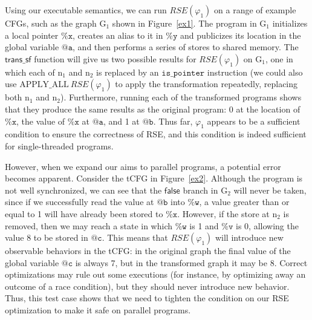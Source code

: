 \documentclass{eptcs}
\begin{document}
Using our executable semantics, we can run $\mathit{RSE}(\varphi_1)$ on a range of example \acp{CFG}, such as the graph $\mathrm{G_1}$ shown in Figure~\ref{ex1}. The program in $\mathrm{G_1}$ initializes a local pointer $\mathtt{\%x}$, creates an alias to it in $\mathtt{\%y}$ and publicizes its location in the global variable $\mathtt{@a}$, and then performs a series of stores to shared memory.
The $\mathsf{trans\_sf}$ function will give us two possible results for $\mathit{RSE}(\varphi_1)$ on $\mathrm{G_1}$, one in which each of $\mathrm{n_1}$ and $\mathrm{n_2}$ is replaced by an $\mathtt{is\_pointer}$ instruction (we could also use $\mathrm{APPLY\_ALL}\ \mathit{RSE}(\varphi_1)$ to apply the transformation repeatedly, replacing both $\mathrm{n_1}$ and $\mathrm{n_2}$). Furthermore, running each of the transformed programs shows that they produce the same results as the original program: 0 at the location of $\mathtt{\%x}$, the value of $\mathtt{\%x}$ at $\mathtt{@a}$, and 1 at $\mathtt{@b}$. Thus far, $\varphi_1$ appears to be a sufficient condition to ensure the correctness of RSE, and this condition is indeed sufficient for single-threaded programs.

However, when we expand our aims to parallel programs, a potential error becomes apparent. Consider the \ac{tCFG} in Figure~\ref{ex2}.
Although the program is not well synchronized, we can see that the $\mathsf{false}$ branch in $\mathrm{G_2}$ will never be taken, since if we successfully read the value at $\mathtt{@b}$ into $\mathtt{\%w}$, a value greater than or equal to 1 will have already been stored to $\mathtt{\%x}$. However, if the store at $\mathrm{n_2}$ is removed, then we may reach a state in which $\mathtt{\%w}$ is 1 and $\mathtt{\%v}$ is 0, allowing the value 8 to be stored in $\mathtt{@c}$. This means that $\mathit{RSE}(\varphi_1)$ will introduce new observable behaviors in the \ac{tCFG}: in the original graph the final value of the global variable $\mathtt{@c}$ is always 7, but in the transformed graph it may be 8. Correct optimizations may rule out some executions (for instance, by optimizing away an outcome of a race condition), but they should never introduce new behavior. Thus, this test case shows that we need to tighten the condition on our RSE optimization to make it safe on parallel programs.
\end{document}
